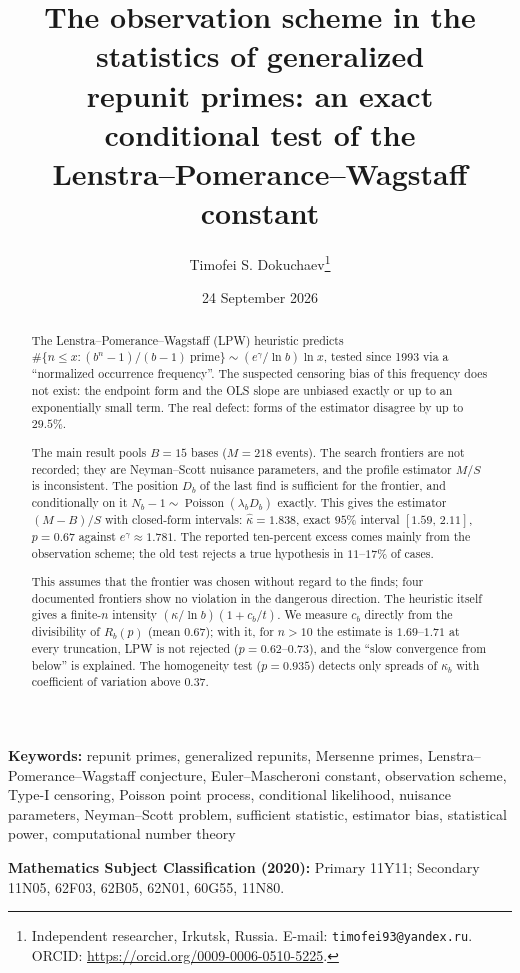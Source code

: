 \documentclass[11pt,a4paper]{article}
\title{The observation scheme in the statistics of generalized\\
repunit primes: an exact conditional test of the\\
Lenstra--Pomerance--Wagstaff constant}
\author{Timofei S. Dokuchaev\thanks{Independent researcher, Irkutsk, Russia.
E-mail: \texttt{timofei93@yandex.ru}. ORCID:
\url{https://orcid.org/0009-0006-0510-5225}.}}
\date{24 September 2026}
\theoremstyle{plain}
\theoremstyle{remark}
\DeclareMathOperator{\Pois}{Poisson}
\begin{document}
\maketitle

\begin{abstract}
\noindent The Lenstra--Pomerance--Wagstaff (LPW) heuristic predicts
$\#\{n\le x: (b^n-1)/(b-1)\ \text{prime}\}\sim(e^{\gamma}/\ln b)\ln x$, tested
since 1993 via a ``normalized occurrence frequency''. The suspected
censoring bias of this frequency does not exist: the endpoint form and the OLS
slope are unbiased exactly or up to an exponentially small term. The real defect:
forms of the estimator disagree by up to $29.5\%$.

The main result pools $B=15$ bases ($M=218$ events). The search
frontiers are not recorded; they are Neyman--Scott nuisance parameters, and the
profile estimator $M/S$ is inconsistent. The position $D_b$ of the last find is
sufficient for the frontier, and conditionally on it
$N_b-1\sim\Pois(\lambda_bD_b)$ exactly. This gives the estimator $(M-B)/S$ with
closed-form intervals: $\hat\kappa=1.838$, exact $95\%$ interval
$[1.59,\,2.11]$, $p=0.67$ against $e^{\gamma}\approx1.781$. The reported
ten-percent excess comes mainly from the observation scheme; the old test rejects
a true hypothesis in $11$--$17\%$ of cases.

This assumes that the frontier was chosen without regard to the finds; four
documented frontiers show no violation in the dangerous direction. The heuristic
itself gives a finite-$n$ intensity $(\kappa/\ln b)(1+c_b/t)$. We measure $c_b$
directly from the divisibility of $R_b(p)$ (mean $0.67$); with it, for $n>10$ the
estimate is $1.69$--$1.71$ at every truncation, LPW is not rejected
($p=0.62$--$0.73$), and the ``slow convergence from below'' is explained. The
homogeneity test ($p=0.935$) detects only spreads of $\kappa_b$ with coefficient
of variation above $0.37$.
\end{abstract}

\medskip
\noindent\textbf{Keywords:} repunit primes, generalized repunits, Mersenne
primes, Lenstra--Pomerance--Wagstaff conjecture, Euler--Mascheroni constant,
observation scheme, Type-I censoring, Poisson point process,
conditional likelihood, nuisance parameters, Neyman--Scott problem, sufficient
statistic, estimator bias, statistical power, computational number theory

\medskip
\noindent\textbf{Mathematics Subject Classification (2020):}
Primary 11Y11; Secondary 11N05, 62F03, 62B05, 62N01, 60G55, 11N80.
\end{document}
